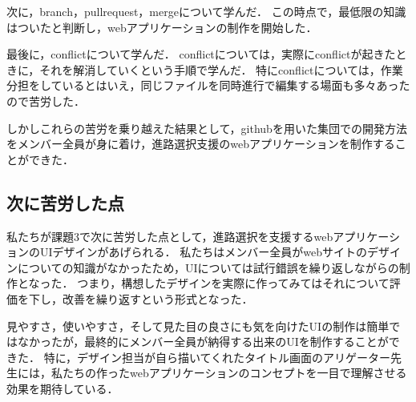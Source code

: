 \documentclass[a4j，titlepage]{jarticle}
\begin{document}
次に，branch，pullrequest，mergeについて学んだ．
この時点で，最低限の知識はついたと判断し，webアプリケーションの制作を開始した．

最後に，conflictについて学んだ．
conflictについては，実際にconflictが起きたときに，それを解消していくという手順で学んだ．
特にconflictについては，作業分担をしているとはいえ，同じファイルを同時進行で編集する場面も多々あったので苦労した．

しかしこれらの苦労を乗り越えた結果として，githubを用いた集団での開発方法をメンバー全員が身に着け，進路選択支援のwebアプリケーションを制作することができた．
\subsection{次に苦労した点}
私たちが課題3で次に苦労した点として，進路選択を支援するwebアプリケーションのUIデザインがあげられる．
私たちはメンバー全員がwebサイトのデザインについての知識がなかったため，UIについては試行錯誤を繰り返しながらの制作となった．
つまり，構想したデザインを実際に作ってみてはそれについて評価を下し，改善を繰り返すという形式となった．

見やすさ，使いやすさ，そして見た目の良さにも気を向けたUIの制作は簡単ではなかったが，最終的にメンバー全員が納得する出来のUIを制作することができた．
特に，デザイン担当が自ら描いてくれたタイトル画面のアリゲーター先生には，私たちの作ったwebアプリケーションのコンセプトを一目で理解させる効果を期待している．\\
\end{document}
